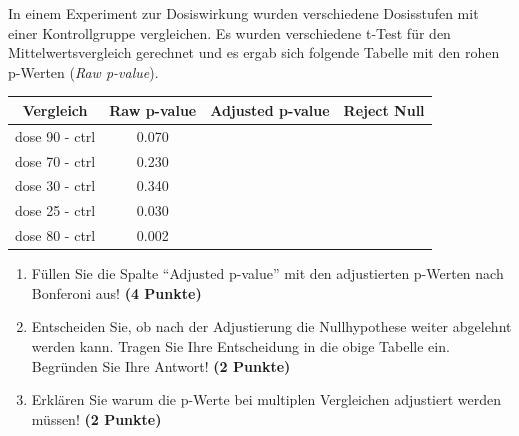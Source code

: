 \documentclass[a4paper, 9pt]{scrartcl}\usepackage[]{graphicx}\usepackage[]{xcolor}
\newenvironment{knitrout}{}{} %
\begin{document}
In einem Experiment zur Dosiswirkung wurden verschiedene Dosisstufen mit
einer Kontrollgruppe vergleichen. Es wurden verschiedene t-Test f{\"u}r den
Mittelwertsvergleich gerechnet und es ergab sich folgende Tabelle mit den
rohen p-Werten (\textit{Raw p-value}).


\begin{knitrout}
\color{fgcolor}\begin{table}[!h]
\centering\begingroup\fontsize{12}{14}\selectfont

\begin{tabular}{cccc}
\toprule
Vergleich & Raw p-value & Adjusted p-value & Reject Null\\
\midrule
dose 90 - ctrl & 0.070 &  & \\
dose 70 - ctrl & 0.230 &  & \\
dose 30 - ctrl & 0.340 &  & \\
dose 25 - ctrl & 0.030 &  & \\
dose 80 - ctrl & 0.002 &  & \\
\bottomrule
\end{tabular}
\endgroup{}
\end{table}

\end{knitrout}



\begin{enumerate}
\item F{\"u}llen Sie die Spalte "`Adjusted p-value"' mit den adjustierten
  p-Werten nach Bonferoni aus! \textbf{(4 Punkte)}
\item Entscheiden Sie, ob nach der Adjustierung die Nullhypothese weiter
  abgelehnt werden kann. Tragen Sie Ihre Entscheidung in die obige Tabelle
  ein. Begr{\"u}nden Sie Ihre Antwort! \textbf{(2 Punkte)}
\item Erkl{\"a}ren Sie warum die p-Werte bei multiplen Vergleichen
  adjustiert werden m{\"u}ssen! \textbf{(2 Punkte)}
\end{enumerate}
\end{document}
